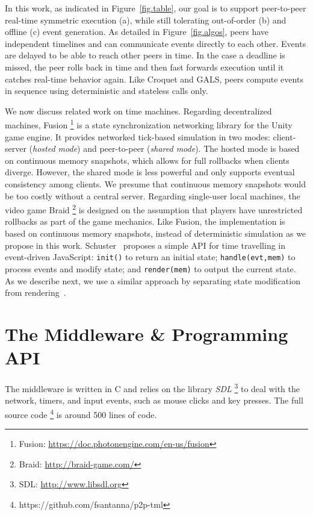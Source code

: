 \documentclass[fleqn,10pt]{SelfArx}
\newcommand{\code}[1]  {\texttt{\footnotesize{#1}}}
\begin{document}
In this work, as indicated in Figure~\ref{fig.table}, our goal is to support
peer-to-peer real-time symmetric execution (a), while still tolerating
out-of-order (b) and offline (c) event generation.
%
As detailed in Figure~\ref{fig.algos}, peers have independent timelines and
can communicate events directly to each other.
Events are delayed to be able to reach other peers in time.
In the case a deadline is missed, the peer rolls back in time and then fast
forwards execution until it catches real-time behavior again.
%
Like Croquet and GALS, peers compute events in sequence using deterministic and
stateless calls only.

We now discuss related work on time machines.
%
Regarding decentralized machines, Fusion%
\footnote{Fusion: \url{https://doc.photonengine.com/en-us/fusion}}
is a state synchronization networking library for the Unity game engine.
It provides networked tick-based simulation in two modes: client-server
(\emph{hosted mode}) and peer-to-peer (\emph{shared mode}).
The hosted mode is based on continuous memory snapshots, which allows for
full rollbacks when clients diverge.
However, the shared mode is less powerful and only supports eventual
consistency among clients.
We presume that continuous memory snapshots would be too costly without a
central server.
%
Regarding single-user local machines, the video game Braid%
\footnote{Braid: \url{http://braid-game.com/}}
is designed on the assumption that players have unrestricted rollbacks as part
of the game mechanics.
Like Fusion, the implementation is based on continuous memory snapshots,
instead of deterministic simulation as we propose in this work.
%
Schuster~\cite{tml.js} proposes a simple API for time travelling in
event-driven JavaScript:
    \code{init()} to return an initial state;
    \code{handle(evt,mem)} to process events and modify state; and
    \code{render(mem)} to output the current state.
As we describe next, we use a similar approach by separating state modification
from rendering~\cite{tml.alive}.

\section{The Middleware \& Programming API}
\label{sec.tml}

The middleware is written in C and relies on the library \emph{SDL}%
\footnote{SDL: \url{http://www.libsdl.org}}
to deal with the network, timers, and input events, such as mouse clicks and
key presses.
The full source code%
\footnote{https://github.com/fsantanna/p2p-tml}
is around 500 lines of code.
\end{document}
